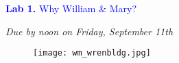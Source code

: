 \documentclass{article}
\begin{document}
\vspace*{.01mm}

\begin{center}

\Large{\textcolor{blue}{\textbf{Lab 1.}  Why William \& Mary?}}

\vspace{4mm}

\textit{Due by noon on Friday, September 11th}\\

\end{center}

\begin{figure}[h!]
\begin{center}
\texttt{[image: wm\_wrenbldg.jpg]}

\end{center}
\end{figure}

\setlength{\parindent}{0cm}
\end{document}
